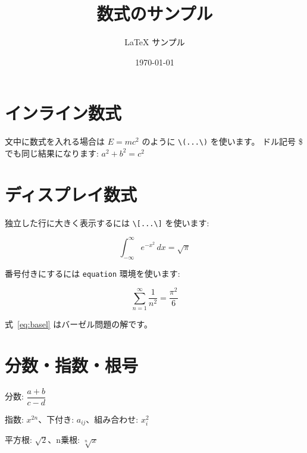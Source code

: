 \documentclass[lualatex,ja=standard]{bxjsarticle}
\title{数式のサンプル}
\author{LaTeX サンプル}
\date{\today}
\begin{document}
\maketitle

\section{インライン数式}

文中に数式を入れる場合は \( E = mc^2 \) のように \texttt{\textbackslash(...\textbackslash)} を使います。
ドル記号 \$ でも同じ結果になります: $a^2 + b^2 = c^2$

\section{ディスプレイ数式}

独立した行に大きく表示するには \texttt{\textbackslash[...\textbackslash]} を使います:

\[
  \int_{-\infty}^{\infty} e^{-x^2} \, dx = \sqrt{\pi}
\]

番号付きにするには \texttt{equation} 環境を使います:

\begin{equation}
  \sum_{n=1}^{\infty} \frac{1}{n^2} = \frac{\pi^2}{6}
  \label{eq:basel}
\end{equation}

式~\eqref{eq:basel} はバーゼル問題の解です。

\section{分数・指数・根号}

分数: $\dfrac{a+b}{c-d}$

指数: $x^{2n}$、下付き: $a_{ij}$、組み合わせ: $x_i^2$

平方根: $\sqrt{2}$、n乗根: $\sqrt[n]{x}$

\end{document}
